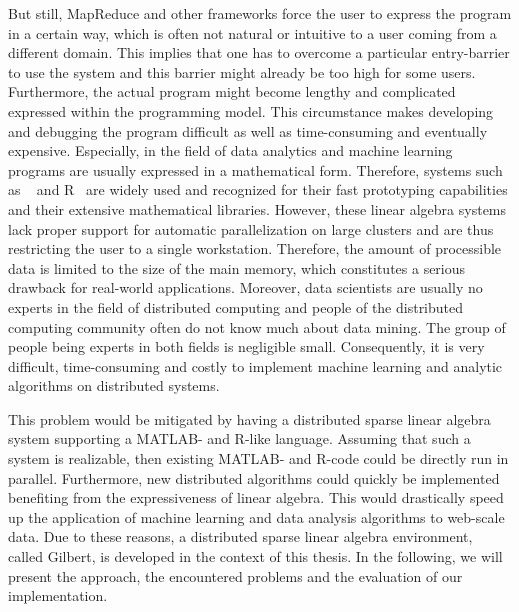 But still, MapReduce and other frameworks force the user to express the program in a certain way, which is often not natural or intuitive to a user coming from a different domain.
This implies that one has to overcome a particular entry-barrier to use the system and this barrier might already be too high for some users.
Furthermore, the actual program might become lengthy and complicated expressed within the programming model.
This circumstance makes developing and debugging the program difficult as well as time-consuming and eventually expensive.
Especially, in the field of data analytics and machine learning programs are usually expressed in a mathematical form.
Therefore, systems such as \matlab~\cite{matlab} and R~\cite{r:1993a} are widely used and recognized for their fast prototyping capabilities and their extensive mathematical libraries.
However, these linear algebra systems lack proper support for automatic parallelization on large clusters and are thus restricting the user to a single workstation.
Therefore, the amount of processible data is limited to the size of the main memory, which constitutes a serious drawback for real-world applications.
Moreover, data scientists are usually no experts in the field of distributed computing and people of the distributed computing community often do not know much about data mining.
The group of people being experts in both fields is negligible small.
Consequently, it is very difficult, time-consuming and costly to implement machine learning and analytic algorithms on distributed systems.

This problem would be mitigated by having a distributed sparse linear algebra system supporting a MATLAB- and R-like language.
Assuming that such a system is realizable, then existing MATLAB- and R-code could be directly run in parallel.
Furthermore, new distributed algorithms could quickly be implemented benefiting from the expressiveness of linear algebra.
This would drastically speed up the application of machine learning and data analysis algorithms to web-scale data.
Due to these reasons, a distributed sparse linear algebra environment, called Gilbert, is developed in the context of this thesis.
In the following, we will present the approach, the encountered problems and the evaluation of our implementation.